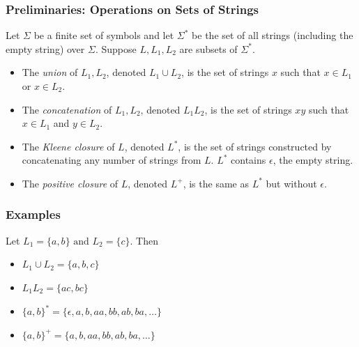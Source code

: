 \begin{frame}[fragile]
  \frametitle{Preliminaries: Operations on Sets of Strings}

    Let $\Sigma$ be a finite set of symbols and let $\Sigma^*$ be the set
    of all strings (including the empty string) over $\Sigma$. Suppose
    $L, L_{1}, L_{2}$ are subsets of $\Sigma^*$.

\pause
  \begin{itemize}[<+->]
  
    \item The \textit{union} of $L_{1}, L_{2}$,
      denoted $L_{1}\cup L_{2}$,  is the set of
      strings $x$ such that
      $x \in L_{1}$ or $x \in L_{2}$.
   \item The \textit{concatenation} of $L_{1}, L_{2}$,
      denoted $L_{1}L_{2}$,  is the set of
      strings $xy$ such that
      $x \in L_{1}$ and $y \in L_{2}$.
    \item The \textit{Kleene closure} of $L$, denoted $L^*$, is the set of
      strings constructed by concatenating any number of strings from
      $L$. $L^*$ contains $\epsilon$, the empty string.
    \item The \textit{positive closure} of $L$, denoted $L^+$, is the same as
      $L^*$ but without $\epsilon$.

  \end{itemize}
\end{frame}

\begin{frame}[fragile]
  \frametitle{Examples}

Let $L_1 = \{a, b\} \text{ and } L_2 = \{c\}$. Then
\pause

\begin{itemize}[<+->]
  \item $L_{1}\cup L_{2} = \{a, b, c\}$
  \item $L_{1}L_{2} = \{ac, bc\}$
  \item $\{a, b\}^* = \{\epsilon, a, b, aa, bb, ab, ba, \ldots\}$
  \item $\{a, b\}^+ = \{a, b, aa, bb, ab, ba, \ldots\}$
\end{itemize}
\end{frame}

